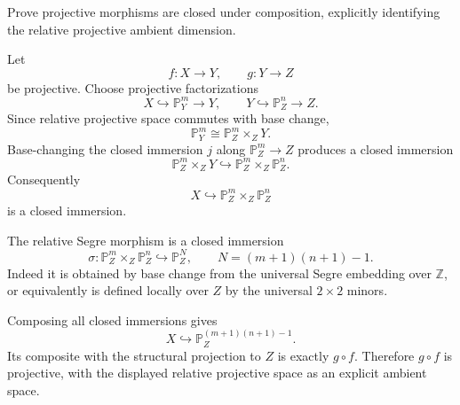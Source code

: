 \begin{problem}\label{prob:vi38-11}
Prove projective morphisms are closed under composition, explicitly identifying the relative projective ambient dimension.
\end{problem}

\ifdefined\FullProblemDossiers
\begin{solution}
Let
\[
f:X\to Y,
\qquad
g:Y\to Z
\]
be projective. Choose projective factorizations
\[
X\hookrightarrow\mathbb P^m_Y\to Y,
\qquad
Y\hookrightarrow\mathbb P^n_Z\to Z.
\]
Since relative projective space commutes with base change,
\[
\mathbb P^m_Y
\cong
\mathbb P^m_Z\times_ZY.
\]
Base-changing the closed immersion \(j\) along \(\mathbb P^m_Z\to Z\) produces a
closed immersion
\[
\mathbb P^m_Z\times_ZY
\hookrightarrow
\mathbb P^m_Z\times_Z\mathbb P^n_Z.
\]
Consequently
\[
X\hookrightarrow
\mathbb P^m_Z\times_Z\mathbb P^n_Z
\]
is a closed immersion.

The relative Segre morphism is a closed immersion
\[
\sigma:
\mathbb P^m_Z\times_Z\mathbb P^n_Z
\hookrightarrow
\mathbb P^N_Z,
\qquad
N=(m+1)(n+1)-1.
\]
Indeed it is obtained by base change from the universal Segre embedding over
\(\mathbb Z\), or equivalently is defined locally over \(Z\) by the universal
\(2\times2\) minors.

Composing all closed immersions gives
\[
\boxed{X\hookrightarrow\mathbb P^{(m+1)(n+1)-1}_Z}.
\]
Its composite with the structural projection to \(Z\) is exactly \(g\circ f\).
Therefore \(g\circ f\) is projective, with the displayed relative projective space
as an explicit ambient space.
\end{solution}
\fi
